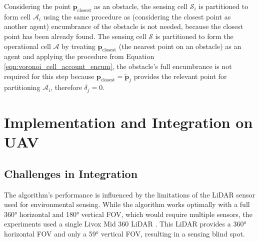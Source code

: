             Considering the point $\mathbf{p}_{\text{closest}}$ as an obstacle, the sensing cell $\mathcal{S}_i$ is partitioned to form cell $\mathcal{A}_i$ using the same procedure as  (considering the closest point as another agent) encumbrance of the obstacle is not needed, because the closest point has been already found.
            The sensing cell $\mathcal{S}$ is partitioned to form the operational cell $\mathcal{A}$ by treating $\mathbf{p}_{\text{closest}}$ (the nearest point on an obstacle) as an agent and applying the procedure from Equation \eqref{eqn:voronoi_cell_account_encum}, the obstacle's full encumbrance is not required for this step because $\mathbf{p}_{\text{closest}} = \tilde{\mathbf{p}}_{j}$ provides the relevant point for partitioning $\mathcal{A}_i$, therefore $\delta_j = 0$.

            

    \section{Implementation and Integration on UAV}
    \label{sec:implementation_integration}
        \subsection{Challenges in Integration}
            The algorithm's performance is influenced by the limitations of the \ac{LiDAR} sensor used for environmental sensing. 
            While the algorithm works optimally with a full 360° horizontal and 180° vertical \ac{FOV}, which would require multiple sensors, the experiments used a single Livox Mid 360 \ac{LiDAR} \cite{livox_mid360}. 
            This \ac{LiDAR} provides a 360° horizontal \ac{FOV} and only a 59° vertical \ac{FOV}, resulting in a sensing blind spot.

